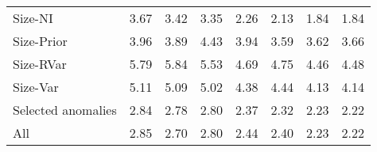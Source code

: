 \begin{tabular}{lrrrrrrr}
  
    
    
    Size-NI  & 3.67  & 3.42  & 3.35  & 2.26  & 2.13  & 1.84  & 1.84  \\
    
  
    
    
    Size-Prior  & 3.96  & 3.89  & 4.43  & 3.94  & 3.59  & 3.62  & 3.66  \\
    
  
    
    
    Size-RVar  & 5.79  & 5.84  & 5.53  & 4.69  & 4.75  & 4.46  & 4.48  \\
    
  
    
    
    Size-Var  & 5.11  & 5.09  & 5.02  & 4.38  & 4.44  & 4.13  & 4.14  \\
    
  
    
    
    Selected anomalies  & 2.84  & 2.78  & 2.80  & 2.37  & 2.32  & 2.23  & 2.22  \\
    [1em]
  
    
    
    All  & 2.85  & 2.70  & 2.80  & 2.44  & 2.40  & 2.23  & 2.22  \\
    
  
  \bottomrule
\end{tabular}
